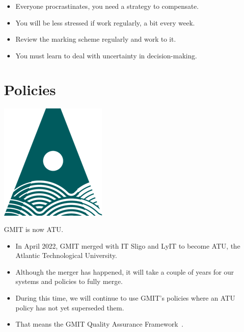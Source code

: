 \documentclass[a4paper]{tufte-handout}
\begin{document}
\begin{itemize}
  \item Everyone procrastinates, you need a strategy to compensate.
  \item You will be less stressed if work regularly, a bit every week.
  \item Review the marking scheme regularly and work to it.
  \item You must learn to deal with uncertainty in decision-making.
\end{itemize}

\section{Policies}
\begin{marginfigure}%
  \centering
  \includegraphics[width=0.6\linewidth]{img/atu-green.png}
  \caption*{GMIT is now ATU.}
  \label{fig:atulogo}
\end{marginfigure}
\begin{itemize}
  \item In April 2022, GMIT merged with IT Sligo and LyIT to become ATU, the Atlantic Technological University.
  \item Although the merger has happened, it will take a couple of years for our systems and policies to fully merge.
  \item During this time, we will continue to use GMIT's policies where an ATU policy has not yet superseded them.
  \item That means the GMIT Quality Assurance Framework~\cite{gmitqaf}.
\end{itemize} 



\end{document}
